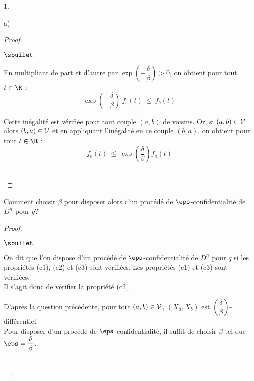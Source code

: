 \documentclass[11pt]{article}%
\begin{document}
\begin{noliste}{1.}
\begin{noliste}{a)}
\begin{proof}
\begin{noliste}{$\sbullet$}
      \item En multipliant de part et d'autre par $\exp\left( -
          \dfrac{\delta}{\beta} \right) > 0$, on obtient pour tout $t
        \in \R$ :
        \[
        \exp\left( - \dfrac{\delta}{\beta} \right) \ f_a(t) \ \leq \
        f_b(t)
        \]

      \item Cette inégalité est vérifiée pour tout couple $(a, b)$ de
        voisins. Or, si $(a, b) \in {\cal V}$ alors $(b, a) \in {\cal
          V}$ et en appliquant l'inégalité en ce couple $(b, a)$, on
        obtient pour tout $t \in \R$ :
        \[
        f_b(t) \ \leq \ \exp\left(\dfrac{\delta}{\beta}\right) f_a(t)
        \]
      \end{noliste}
      ~\\[-1cm]
    \end{proof}
  
  \item Comment choisir $\beta$ pour disposer alors d'un procédé de
    $\eps$-confidentialité de $D^n$ pour $q$?

    \begin{proof}~%
      \begin{noliste}{$\sbullet$}
      \item On dit que l'on dispose d'un procédé de
        $\eps$-confidentialité de $D^n$ pour $q$ si les propriétés
        (c1), (c2) et (c3) sont vérifiées. Les propriétés (c1) et (c3)
        sont vérifiées.\\
        Il s'agit donc de vérifier la propriété (c2).

      \item D'après la question précédente, pour tout $(a, b) \in
        {\cal V}$, $(X_a, X_b)$ est $\left( \dfrac{\delta}{\beta}
        \right)$-différentiel.\\
        Pour disposer d'un procédé de $\eps$-confidentialité, il
        suffit de choisir $\beta$ tel que $\eps =
        \dfrac{\delta}{\beta}$.
      \end{noliste}
      ~\\[-1cm]
    \end{proof}
  \end{noliste}


\end{noliste}
\end{document}
